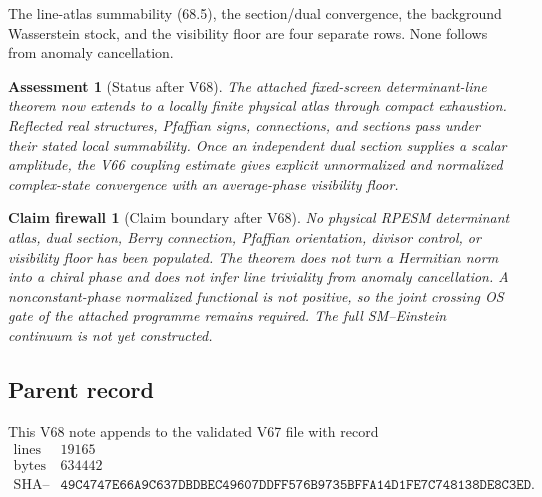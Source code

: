 \documentclass[11pt]{article}
\newtheorem{firewall}[theorem]{Claim firewall}
\newtheorem{assessment}[theorem]{Assessment}
\theoremstyle{remark}
\begin{document}
The line-atlas summability (68.5), the section/dual convergence, the
background Wasserstein stock, and the visibility floor are four
separate rows.  None follows from anomaly cancellation.

\begin{assessment}[Status after V68]
\label{ass:v12v68-status}
The attached fixed-screen determinant-line theorem now extends to a
locally finite physical atlas through compact exhaustion.  Reflected
real structures, Pfaffian signs, connections, and sections pass
under their stated local summability.  Once an independent dual
section supplies a scalar amplitude, the V66 coupling estimate gives
explicit unnormalized and normalized complex-state convergence with
an average-phase visibility floor.
\end{assessment}

\begin{firewall}[Claim boundary after V68]
\label{fire:v12v68-claim}
No physical RPESM determinant atlas, dual section, Berry connection,
Pfaffian orientation, divisor control, or visibility floor has been
populated.  The theorem does not turn a Hermitian norm into a chiral
phase and does not infer line triviality from anomaly cancellation.
A nonconstant-phase normalized functional is not positive, so the
joint crossing OS gate of the attached programme remains required.
The full SM--Einstein continuum is not yet constructed.
\end{firewall}

\subsection{Parent record}

This V68 note appends to the validated V67 file with record
\[
\begin{array}{c|c}
\text{lines}&19165\\
\text{bytes}&634442\\
\text{SHA--256}&
\texttt{49C4747E66A9C637DBDBEC49607DDFF576B9735BFFA14D1FE7C748138DE8C3ED}.
\end{array}
\]

\end{document}
